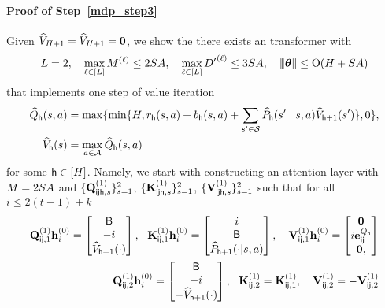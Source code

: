 \paragraph{Proof of Step~\ref{mdp_step3}} Given ${\widehat{{{V}}}}_{{H}+1}={\widehat{{{V}}}}_{{H}+1}={\mathbf 0}$, we show the there exists an transformer with
\begin{align*}
{L}=2,~~~\max_{\ell\in[{L}]}{M}^{(\ell)}\leq2{S}{A},~~~\max_{\ell\in[{L}]}{D'}^{{(\ell)}}\leq3{S}{A},~~~{\left|\!\left|\!\left|{{{\boldsymbol \theta}}}\right|\!\right|\!\right|}\leq {\mathrm{O}}({H}+{S}{A})
\end{align*}
that implements one step of value iteration
\begin{align*}
    {\widehat{{Q}}}_{\mathsf{h}}({s},{a})&=\max\{\min\{{H},{{r}}_{\mathsf{h}}({s},{a})+{b}_{\mathsf{h}}({s},{a})+\sum_{{s}'\in{\mathcal{S}}}\widehat{P}_{\mathsf{h}}({s}'\mid{s},{a}){\widehat{{{V}}}}_{{\mathsf{h}}+1}({s}')\},0\},\\
{\widehat{{{V}}}}_{\mathsf{h}}({s})&=\max_{{a}\in{\mathcal{A}}}{\widehat{{Q}}}_{\mathsf{h}}({s},{a})
\end{align*} for some ${\mathsf{h}}\in[{H}]$. 
Namely, we start with constructing an-attention layer with ${M}=2{S}{A}$ and $\{{\mathbf Q}_{{\mathsf{i}}{\mathsf{j}}{\mathsf{h}},s}^{(1)}\}^2_{s=1}$, $\{{\mathbf K}_{{\mathsf{i}}{\mathsf{j}}{\mathsf{h}},s}^{(1)}\}^2_{s=1}$, $\{{\mathbf V}_{{\mathsf{i}}{\mathsf{j}}{\mathsf{h}},s}^{(1)}\}^2_{s=1}$ such that for all $i\leq 2(t-1)+k$
\begin{align*}
   {\mathbf Q}_{{\mathsf{i}}{\mathsf{j}},1}^{(1)}{\mathbf h}_i^{(0)} =\begin{bmatrix}
       {\mathsf{B}}\\-i\\
       {\widehat{{{V}}}}_{{\mathsf{h}}+1}(\cdot)\\
   \end{bmatrix},~~ {\mathbf K}_{{\mathsf{i}}{\mathsf{j}},1}^{(1)}{\mathbf h}_i^{(0)} =\begin{bmatrix}
       i\\ {\mathsf{B}}\\
       \widehat{P}_{{\mathsf{h}}+1}(\cdot|{s},{a})\\
   \end{bmatrix},~~~
   {\mathbf V}_{{\mathsf{i}}{\mathsf{j}},1}^{(1)}{\mathbf h}_i^{(0)} =\begin{bmatrix}
       {\mathbf 0} \\ i{\mathbf e}^{{Q}_{\mathsf{h}}}_{{\mathsf{i}}{\mathsf{j}}}\\
       {\mathbf 0},
   \end{bmatrix}
   \\
    {\mathbf Q}_{{\mathsf{i}}{\mathsf{j}},2}^{(1)}{\mathbf h}_i^{(0)} =\begin{bmatrix}
       {\mathsf{B}}\\-i\\
       -{\widehat{{{V}}}}_{{\mathsf{h}}+1}(\cdot)\\
   \end{bmatrix},~~ {\mathbf K}_{{\mathsf{i}}{\mathsf{j}},2}^{(1)}={\mathbf K}_{{\mathsf{i}}{\mathsf{j}},1}^{(1)},~~~
{\mathbf V}_{{\mathsf{i}}{\mathsf{j}},2}^{(1)}=-{\mathbf V}_{{\mathsf{i}}{\mathsf{j}},2}^{(1)}
\end{align*}
